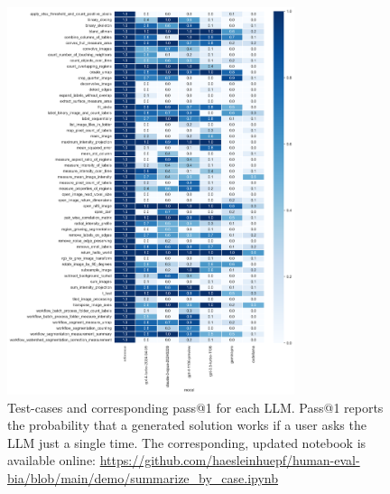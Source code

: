 \documentclass{ecai}
\begin{document}
\begin{figure}[h]
\centering
\includegraphics[width=0.75\textwidth]{performance_per_task.png}
\caption{Test-cases and corresponding pass@1 for each LLM. Pass@1 reports the probability that a generated solution works if a user asks the LLM just a single time. The corresponding, updated notebook is available online:
\url{https://github.com/haesleinhuepf/human-eval-bia/blob/main/demo/summarize_by_case.ipynb}
\newline
\newline
}
\label{fig:performancepertask}
\end{figure}


%
\end{document}
